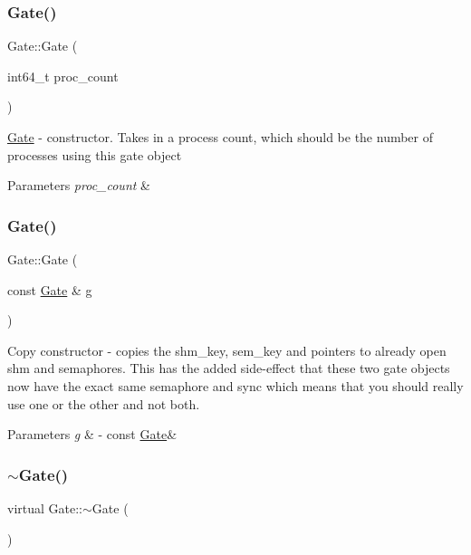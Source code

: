 \subsubsection{\texorpdfstring{Gate()}{Gate()}\hspace{0.1cm}{\footnotesize\ttfamily [1/2]}}
{\footnotesize\ttfamily Gate\+::\+Gate (\begin{DoxyParamCaption}\item[{int64\+\_\+t}]{proc\+\_\+count }\end{DoxyParamCaption})}

\hyperlink{class_gate}{Gate} -\/ constructor. Takes in a process count, which should be the number of processes using this gate object 
\begin{DoxyParams}{Parameters}
{\em proc\+\_\+count} & \\
\hline
\end{DoxyParams}
\hypertarget{class_gate_ab88149aa6cd8284f63cb0a38be1b406f}{}\label{class_gate_ab88149aa6cd8284f63cb0a38be1b406f} 
\subsubsection{\texorpdfstring{Gate()}{Gate()}\hspace{0.1cm}{\footnotesize\ttfamily [2/2]}}
{\footnotesize\ttfamily Gate\+::\+Gate (\begin{DoxyParamCaption}\item[{const \hyperlink{class_gate}{Gate} \&}]{g }\end{DoxyParamCaption})}

Copy constructor -\/ copies the shm\+\_\+key, sem\+\_\+key and pointers to already open shm and semaphores. This has the added side-\/effect that these two gate objects now have the exact same semaphore and sync which means that you should really use one or the other and not both. 
\begin{DoxyParams}{Parameters}
{\em g} & -\/ const \hyperlink{class_gate}{Gate}\& \\
\hline
\end{DoxyParams}
\hypertarget{class_gate_a1cce7f16a7c36254b75b0633fb6823ac}{}\label{class_gate_a1cce7f16a7c36254b75b0633fb6823ac} 
\subsubsection{\texorpdfstring{$\sim$\+Gate()}{~Gate()}}
{\footnotesize\ttfamily virtual Gate\+::$\sim$\+Gate (\begin{DoxyParamCaption}{ }\end{DoxyParamCaption})\hspace{0.3cm}{\ttfamily [virtual]}}

